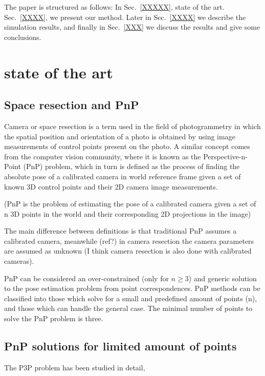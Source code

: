 \documentclass[letterpaper, 10 pt, conference]{ieeeconf}  %
\begin{document}
The paper is structured as follows:  In Sec.~\ref{XXXXX}, state of the art. Sec.~\ref{XXXX}, we present our method. Later in Sec.~\ref{XXXX} we describe the simulation results, and finally in Sec.~\ref{XXX} we discuss the results and give some conclusions.

\section{state of the art}
\label{state_of_the_art}
\subsection{Space resection and PnP}
Camera or space resection is a term used in the field of photogrammetry in which the spatial position and orientation of a photo is obtained by using image measurements of control points present on the photo. A similar concept comes from the computer vision community, where it is known as the Perspective-n-Point (PnP) problem, which in turn is defined as the process of finding the absolute pose of a calibrated camera in world reference frame given a set of known 3D control points and their 2D camera image measurements.

(PnP is the problem of estimating the pose of a calibrated camera given a set of n 3D points in the world and their corresponding 2D projections in the image)

The main difference between definitions is that traditional PnP assumes a calibrated camera, meanwhile (ref?) in camera resection the camera parameters are assumed as unknown (I think camera resection is also done with calibrated cameras). 

PnP can be considered an over-constrained (only for $n \geq 3$) and generic solution to the pose estimation problem from point correspondences. PnP methods can be classified into those which solve for a small and predefined amount of points (n), and those which can handle the general case. The minimal number of points to solve the PnP problem is three.


\subsection{PnP solutions for limited amount of points}
The P3P problem has been studied in detail,

\end{document}
